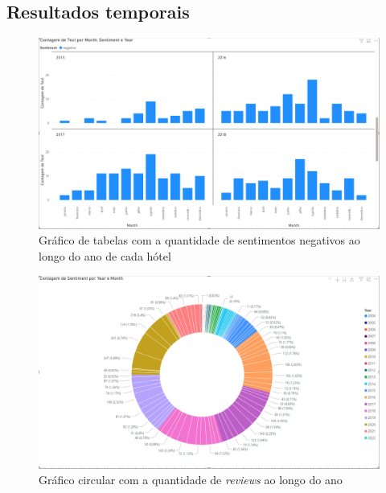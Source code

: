 \subsection{Resultados temporais}

\begin{figure}[!htb]
\centering
\includegraphics[width=16cm]{figuras/NegPerYear/1.PNG}
\caption{Gráfico de tabelas com a quantidade de sentimentos negativos ao longo do ano de cada hótel}
\label{fig:sentpercentbejatimed}
\end{figure}

\begin{figure}[!htb]
\centering
\includegraphics[width=16cm]{figuras/NrReviewsPerYear/CircleGraph.PNG}
\caption{Gráfico circular com a quantidade de \textit{reviews} ao longo do ano}
\label{fig:revspercentbejatimed}
\end{figure}

